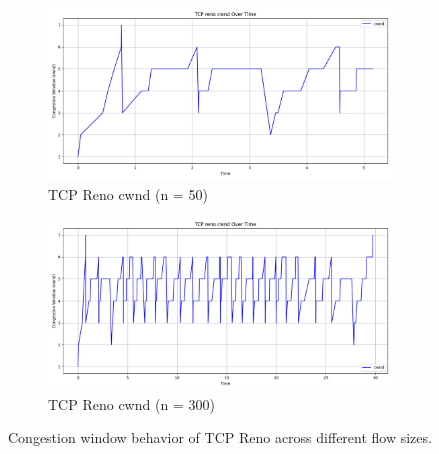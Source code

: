 \documentclass[conference]{IEEEtran}
\begin{document}
\begin{figure}[h!]
    \centering
    \begin{subfigure}[t]{0.48\textwidth}
        \centering
        \includegraphics[width=\linewidth]{assets/n50_reno_cwnd_over_time.png}
        \caption{TCP Reno cwnd (n = 50)}
        \label{fig:reno_n50}
    \end{subfigure}
    \hfill
    \begin{subfigure}[t]{0.48\textwidth}
        \centering
        \includegraphics[width=\linewidth]{assets/n300_reno_cwnd_over_time.png}
        \caption{TCP Reno cwnd (n = 300)}
        \label{fig:reno_n300}
    \end{subfigure}
    \caption{Congestion window behavior of TCP Reno across different flow sizes.}
    \label{fig:n_reno_cwnd}
\end{figure}
\end{document}
